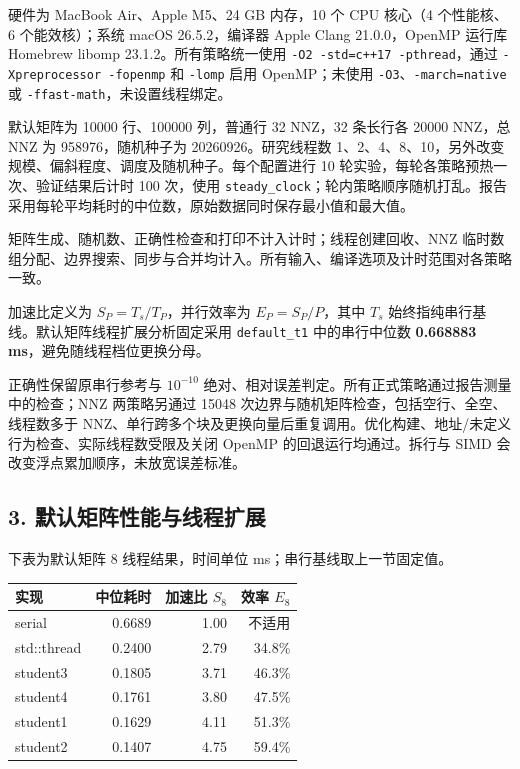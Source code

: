 \documentclass[
  10pt,
  a4paper,
]{article}
\begin{document}
硬件为 MacBook Air、Apple M5、24 GB 内存，10 个 CPU 核心（4 个性能核、6
个能效核）；系统 macOS 26.5.2，编译器 Apple Clang 21.0.0，OpenMP 运行库
Homebrew libomp 23.1.2。所有策略统一使用
\texttt{-O2\ -std=c++17\ -pthread}，通过
\texttt{-Xpreprocessor\ -fopenmp} 和 \texttt{-lomp} 启用 OpenMP；未使用
\texttt{-O3}、\texttt{-march=native} 或
\texttt{-ffast-math}，未设置线程绑定。

默认矩阵为 10000 行、100000 列，普通行 32 NNZ，32 条长行各 20000 NNZ，总
NNZ 为 958976，随机种子为 20260926。研究线程数
1、2、4、8、10，另外改变规模、偏斜程度、调度及随机种子。每个配置进行 10
轮实验，每轮各策略预热一次、验证结果后计时 100 次，使用
\texttt{steady\_clock}；轮内策略顺序随机打乱。报告采用每轮平均耗时的中位数，原始数据同时保存最小值和最大值。

矩阵生成、随机数、正确性检查和打印不计入计时；线程创建回收、NNZ
临时数组分配、边界搜索、同步与合并均计入。所有输入、编译选项及计时范围对各策略一致。

加速比定义为 \(S_P=T_s/T_P\)，并行效率为 \(E_P=S_P/P\)，其中 \(T_s\)
始终指纯串行基线。默认矩阵线程扩展分析固定采用 \texttt{default\_t1}
中的串行中位数 \textbf{0.668883 ms}，避免随线程档位更换分母。

正确性保留原串行参考与 \(10^{-10}\)
绝对、相对误差判定。所有正式策略通过报告测量中的检查；NNZ 两策略另通过
15048 次边界与随机矩阵检查，包括空行、全空、线程数多于
NNZ、单行跨多个块及更换向量后重复调用。优化构建、地址/未定义行为检查、实际线程数受限及关闭
OpenMP 的回退运行均通过。拆行与 SIMD
会改变浮点累加顺序，未放宽误差标准。

\newpage

\subsection{3.
默认矩阵性能与线程扩展}\label{ux9ed8ux8ba4ux77e9ux9635ux6027ux80fdux4e0eux7ebfux7a0bux6269ux5c55}

下表为默认矩阵 8 线程结果，时间单位 ms；串行基线取上一节固定值。

\begin{longtable}[]{@{}lrrr@{}}
\toprule\noalign{}
实现 & 中位耗时 & 加速比 \(S_8\) & 效率 \(E_8\) \\
\midrule\noalign{}
\endhead
\bottomrule\noalign{}
\endlastfoot
serial & 0.6689 & 1.00 & 不适用 \\
std::thread & 0.2400 & 2.79 & 34.8\% \\
student3 & 0.1805 & 3.71 & 46.3\% \\
student4 & 0.1761 & 3.80 & 47.5\% \\
student1 & 0.1629 & 4.11 & 51.3\% \\
student2 & 0.1407 & 4.75 & 59.4\% \\
\end{longtable}
\end{document}
